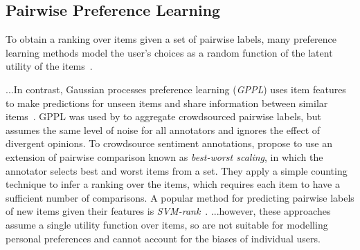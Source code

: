 \subsection{Pairwise Preference Learning} %

To obtain a ranking over items given
a set of pairwise labels, many preference learning methods model
the user's choices as a random function of the latent utility of the items~\citep{thurstone1927law}.

...In contrast, Gaussian processes preference learning (\emph{GPPL})
uses item features to make predictions for unseen items and
share information between similar items~\citep{chu2005preference}.
GPPL was used by \citet{simpson2018finding} to aggregate crowdsourced pairwise labels,
but assumes the same level of noise for all annotators and ignores the effect of divergent opinions.
To crowdsource sentiment annotations, 
\citet{kiritchenko2016capturing} propose to use an extension of pairwise comparison
known as \emph{best-worst scaling}, in which the annotator selects best and worst items from a set.
They apply a simple counting technique to infer a ranking over the items, which requires 
each item to have a sufficient number of comparisons.
A popular method for predicting pairwise labels of new items given their features is 
\emph{SVM-rank}~\citep{joachims2002optimizing}.
...however, these approaches assume a single utility function over items,
so are not suitable for modelling personal preferences 
and cannot account for the biases of individual users.


